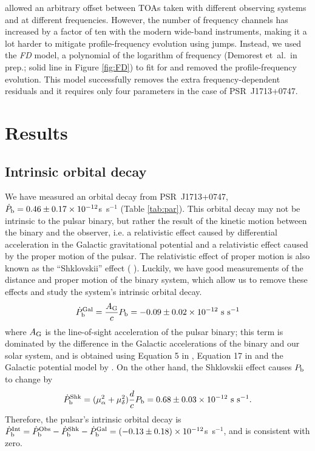 \citet{sns+05} allowed an arbitrary offset between TOAs taken with different
observing systems and at different frequencies.
However, the number of frequency
channels has increased by a factor of ten with the modern wide-band
instruments, making it a lot harder to mitigate profile-frequency evolution using jumps. 
Instead, we used the {\it FD} model, a polynomial of the logarithm of
frequency (Demorest et~al.\ in prep.; solid line in Figure
\ref{fig:FD}) to fit for and removed the profile-frequency
evolution. This model successfully removes the extra
frequency-dependent residuals and it requires only four parameters in the
case of PSR~J1713+0747.





\section{Results}
\label{sec:res}

\subsection{Intrinsic orbital decay}
\label{sec:obdecay}
We have measured an orbital decay from PSR~J1713+0747, $\dot{P}_{\rm b} =
0.46\pm0.17\times10^{-12}$s~s$^{-1}$ (Table \ref{tab:par}).
This orbital decay may not be intrinsic to the pulsar binary, but rather the
result of the kinetic motion between the binary and the
observer, i.e. a relativistic effect caused by differential 
acceleration in the Galactic gravitational potential
\citep{dt91} and a relativistic effect caused by the proper motion of the
pulsar. The relativistic effect
of proper motion is also known as the ``Shklovskii'' effect (
\citealt{shk70}). Luckily, we have good measurements of the distance and proper
motion of the binary system, which allow us to remove these effects and study the system's intrinsic orbital decay.
\begin{equation}
\dot{P}_{\rm b}^{\rm Gal} = \frac{A_{\rm G}}{c} P_{\rm b} =
-0.09\pm0.02\times10^{-12}~{\rm s~s^{-1}}
\end{equation}
where $A_{\rm G}$ is the line-of-sight acceleration of the pulsar binary;
this term is dominated by the difference in the Galactic accelerations of the
binary and our solar system, and is obtained using
Equation 5 in \citet{nt95}, Equation 17 in \citet{lwj+09} and the Galactic
potential model by \citet{hf04a}.
On the other hand, the Shklovskii effect causes $P_{\rm b}$ to
change by
\begin{equation}
\dot{P}_{\rm b}^{\rm Shk} = (\mu_{\alpha}^2+\mu_{\delta}^2)\frac{d}{c}P_{\rm
b} = 0.68\pm0.03\times10^{-12}~{\rm s~s^{-1}}.
\end{equation}
Therefore, the pulsar's intrinsic orbital decay is $\dot{P}_{\rm b}^{\rm Int}
= \dot{P}_{\rm b}^{\rm Obs} - \dot{P}_{\rm b}^{\rm Shk} - \dot{P}_{\rm b}^{\rm
Gal} = (-0.13\pm0.18)\times10^{-12}$s~s$^{-1}$, and is consistent with zero.

